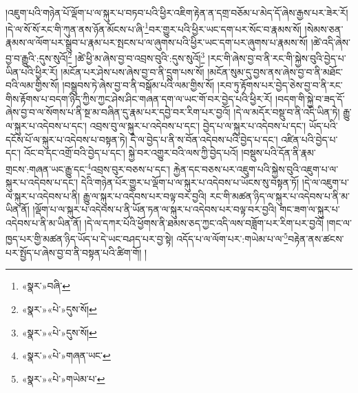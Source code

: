 །འཇུག་པའི་གཉེན་པོ་ལྡོག་པ་ལ་སྐུར་པ་བཏབ་པའི་ཕྱིར་འཇིག་རྟེན་ན་དགྲ་བཅོམ་པ་མེད་དོ་ཞེས་རྒྱས་པར་ཟེར་རོ། །དེ་ལ་སོ་སོ་རང་གི་ཀུན་ནས་ཉོན་མོངས་པ་ཞི་\footnote{«སྣར་»བཞི་}བར་གྱུར་པའི་ཕྱིར་ཡང་དག་པར་སོང་བ་རྣམས་སོ། །སེམས་ཅན་རྣམས་ལ་ལོག་པར་སྒྲུབ་པ་རྣམ་པར་སྤངས་པ་ལ་ཞུགས་པའི་ཕྱིར་ཡང་དག་པར་ཞུགས་པ་རྣམས་སོ། །ཚེ་འདི་ཞེས་བྱ་བ་རྒྱུའི་:དུས་སུའོ།\footnote{«སྣར་»«པེ་»དུས་སོ།} །ཚེ་ཕྱི་མ་ཞེས་བྱ་བ་འབྲས་བུའི་:དུས་སུའོ།\footnote{«སྣར་»«པེ་»དུས་སོ།} །རང་གི་ཞེས་བྱ་བ་ནི་རང་གི་སྐྱེས་བུའི་བྱེད་པ་ཡིན་པའི་ཕྱིར་རོ། །མངོན་པར་ཤེས་པས་ཞེས་བྱ་བ་ནི་དྲུག་པས་སོ། །མངོན་སུམ་དུ་བྱས་ནས་ཞེས་བྱ་བ་ནི་མཐོང་བའི་ལམ་གྱིས་སོ། །བསྒྲུབས་ཏེ་ཞེས་བྱ་བ་ནི་བསྒོམ་པའི་ལམ་གྱིས་སོ། །རབ་ཏུ་རྟོགས་པར་བྱེད་ཅེས་བྱ་བ་ནི་རང་གིས་རྟོགས་པ་བདག་ཉིད་ཀྱིས་ཀྱང་ཤེས་ཤིང་གཞན་དག་ལ་ཡང་གོ་བར་བྱེད་པའི་ཕྱིར་རོ། །བདག་གི་སྐྱེ་བ་ཟད་དོ་ཞེས་བྱ་བ་ལ་སོགས་པ་ནི་སྔ་མ་བཞིན་དུ་རྣམ་པར་དབྱེ་བར་རིག་པར་བྱའོ། །དེ་ལ་མདོར་བསྡུ་བ་ནི་འདི་ཡིན་ཏེ། རྒྱུ་ལ་སྐུར་པ་འདེབས་པ་དང་། འབྲས་བུ་ལ་སྐུར་པ་འདེབས་པ་དང་། བྱེད་པ་ལ་སྐུར་པ་འདེབས་པ་དང་། ཡོད་པའི་དངོས་པོ་ལ་སྐུར་པ་འདེབས་པ་བསྟན་ཏེ། དེ་ལ་བྱེད་པ་ནི་ས་བོན་འདེབས་པའི་བྱེད་པ་དང་། འཛིན་པའི་བྱེད་པ་དང་། འོང་བ་དང་འགྲོ་བའི་བྱེད་པ་དང་། སྐྱེ་བར་འགྱུར་བའི་ལས་ཀྱི་བྱེད་པའོ། །བསྡུས་པའི་དོན་ནི་རྣམ་གྲངས་:གཞན་ཡང་རྒྱུ་དང་\footnote{«སྣར་»«པེ་»གཞན་ཡང་}འབྲས་བུར་བཅས་པ་དང་། རྐྱེན་དང་བཅས་པར་འཇུག་པའི་སྐྱེས་བུའི་འཇུག་པ་ལ་སྐུར་པ་འདེབས་པ་དང་། དེའི་གཉེན་པོར་གྱུར་པ་ལྡོག་པ་ལ་སྐུར་པ་འདེབས་པ་ཡོངས་སུ་བསྟན་ཏོ། །དེ་ལ་འཇུག་པ་ལ་སྐུར་པ་འདེབས་པ་ནི། རྒྱུ་ལ་སྐུར་པ་འདེབས་པར་བལྟ་བར་བྱའི། རང་གི་མཚན་ཉིད་ལ་སྐུར་པ་འདེབས་པ་ནི་མ་ཡིན་ནོ། །ལྡོག་པ་ལ་སྐུར་པ་འདེབས་པ་ནི་ཡོན་ཏན་ལ་སྐུར་པ་འདེབས་པར་བལྟ་བར་བྱའི། གང་ཟག་ལ་སྐུར་པ་འདེབས་པ་ནི་མ་ཡིན་ནོ། །དེ་ལ་དཀར་པོའི་ཕྱོགས་ནི་ཐམས་ཅད་ཀྱང་འདི་ལས་བཟློག་པར་རིག་པར་བྱའོ། །གང་ལ་ཁྱད་པར་གྱི་མཚན་ཉིད་ཡོད་པ་དེ་ཡང་བཤད་པར་བྱ་སྟེ། འདོད་པ་ལ་ལོག་པར་:གཡེམ་པ་ལ་\footnote{«སྣར་»«པེ་»གཡེམ་པ་}བརྟེན་ནས་ཚངས་པར་སྤྱོད་པ་ཞེས་བྱ་བ་ནི་བསྟན་པའི་ཚིག་གོ། །
